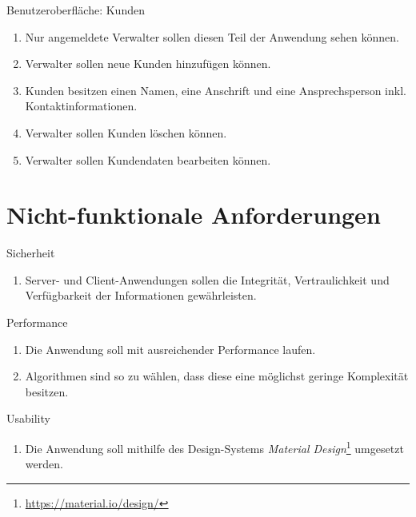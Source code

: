 \documentclass[12pt]{scrreprt}
\newcommand{\itemh}[1]{{\bfseries\large\item #1}}
\begin{document}
\begin{enumerate}
    \itemh{Benutzeroberfläche: Kunden}
    \begin{enumerate}
      \item Nur angemeldete Verwalter sollen diesen Teil der Anwendung sehen können.
      \item Verwalter sollen neue Kunden hinzufügen können.
      \item Kunden besitzen einen Namen, eine Anschrift und eine Ansprechsperson inkl. Kontaktinformationen.
      \item Verwalter sollen Kunden löschen können.
      \item Verwalter sollen Kundendaten bearbeiten können.
    \end{enumerate}
  \end{enumerate}

  \section{Nicht-funktionale Anforderungen}
  \begin{enumerate}
    \itemh{Sicherheit}
    \begin{enumerate}
      \item Server- und Client-Anwendungen sollen die Integrität, Vertraulichkeit und
        Verfügbarkeit der Informationen gewährleisten.
    \end{enumerate}

    \itemh{Performance}
    \begin{enumerate}
      \item Die Anwendung soll mit ausreichender Performance laufen.
      \item Algorithmen sind so zu wählen, dass diese eine möglichst geringe Komplexität besitzen.
    \end{enumerate}

    \itemh{Usability}
    \begin{enumerate}
      \item Die Anwendung soll mithilfe des Design-Systems \textit{Material
        Design}\footnote{\url{https://material.io/design/}}
        umgesetzt werden.
    \end{enumerate}
  \end{enumerate}
\end{document}
